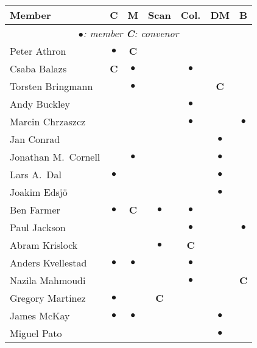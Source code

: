\newcommand{\C}{\textbf{C}}            %
\newcommand{\M}{$\bullet$}             %
\newlength{\Mwidth} \settowidth{\Mwidth}{\M}
\newcommand{\E}{\makebox[\Mwidth]{}}   %
\begin{center}
\renewcommand{\arraystretch}{1.00}
\begin{tabular*}{0.99\textwidth}{@{\extracolsep{\fill}}|lcccccc|}
  \hline
  \textbf{Member} & \textbf{C}    & \textbf{M}   
                  & \textbf{Scan} & \textbf{Col.} 
                  & \textbf{DM}   & \textbf{B} \\
  \hline
  \multicolumn{7}{|c|}{\textit{\M{}: member \hspace{3em} \C{}: convenor}}\\
  Peter Athron          & \M & \C &    &    &    &    \\
  Csaba Balazs          & \C & \M &    & \M &    &    \\
  Torsten Bringmann     &    & \M &    &    & \C &    \\
  Andy Buckley          &    &    &    & \M &    &    \\
  Marcin Chrzaszcz		&    &    &    & \M &    & \M \\
  Jan Conrad            &    &    &    &    & \M &    \\
  Jonathan M.\ Cornell  &    & \M &    &    & \M &    \\
  Lars A.\ Dal          & \M &    &    &    & \M &    \\
  Joakim Edsj\"o        &    &    &    &    & \M &    \\
  Ben Farmer            & \M & \C & \M & \M &    &    \\
  Paul Jackson          &    &    &    & \M &    & \M \\
  Abram Krislock        &    &    & \M & \C &    &    \\
  Anders Kvellestad     & \M & \M &    & \M &    &    \\
  Nazila Mahmoudi       &    &    &    & \M &    & \C \\
  Gregory Martinez      & \M &    & \C &    &    &    \\
  James McKay           & \M & \M &    &    & \M &    \\
  Miguel Pato           &    &    &    &    & \M &    \\

\end{tabular*}
\end{center}
